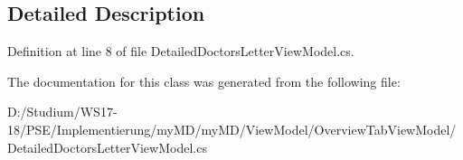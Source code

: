 \subsection{Detailed Description}




Definition at line 8 of file Detailed\-Doctors\-Letter\-View\-Model.cs.

The documentation for this class was generated from the following file:\begin{CompactItemize}
\item 
D:/Studium/WS17-18/PSE/Implementierung/my\-MD/my\-MD/View\-Model/Overview\-Tab\-View\-Model/Detailed\-Doctors\-Letter\-View\-Model.cs\end{CompactItemize}
